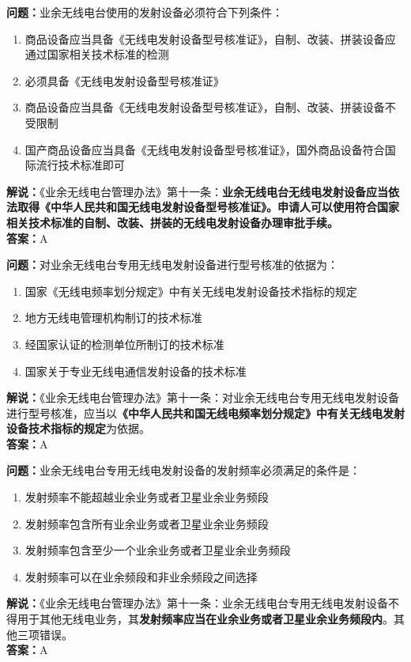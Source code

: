 \textbf{问题：}业余无线电台使用的发射设备必须符合下列条件：
\begin{enumerate}[label=\Alph*), leftmargin=1cm]
	\item 商品设备应当具备《无线电发射设备型号核准证》，自制、改装、拼装设备应通过国家相关技术标准的检测
	\item 必须具备《无线电发射设备型号核准证》
	\item 商品设备应当具备《无线电发射设备型号核准证》，自制、改装、拼装设备不受限制
	\item 国产商品设备应当具备《无线电发射设备型号核准证》，国外商品设备符合国际流行技术标准即可
\end{enumerate}
\textbf{解说：}《业余无线电台管理办法》第十一条：\textbf{业余无线电台无线电发射设备应当依法取得《中华人民共和国无线电发射设备型号核准证》。申请人可以使用符合国家相关技术标准的自制、改装、拼装的无线电发射设备办理审批手续。}\\\textbf{答案：}A


\textbf{问题：}对业余无线电台专用无线电发射设备进行型号核准的依据为：
\begin{enumerate}[label=\Alph*), leftmargin=1cm]
	\item 国家《无线电频率划分规定》中有关无线电发射设备技术指标的规定
	\item 地方无线电管理机构制订的技术标准
	\item 经国家认证的检测单位所制订的技术标准
	\item 国家关于专业无线电通信发射设备的技术标准
\end{enumerate}
\textbf{解说：}《业余无线电台管理办法》第十一条：对业余无线电台专用无线电发射设备进行型号核准，应当以\textbf{《中华人民共和国无线电频率划分规定》中有关无线电发射设备技术指标的规定}为依据。\\\textbf{答案：}A

\textbf{问题：}业余无线电台专用无线电发射设备的发射频率必须满足的条件是：
\begin{enumerate}[label=\Alph*), leftmargin=1cm]
	\item 发射频率不能超越业余业务或者卫星业余业务频段
	\item 发射频率包含所有业余业务或者卫星业余业务频段
	\item 发射频率包含至少一个业余业务或者卫星业余业务频段
	\item 发射频率可以在业余频段和非业余频段之间选择
\end{enumerate}
\textbf{解说：}《业余无线电台管理办法》第十一条：业余无线电台专用无线电发射设备不得用于其他无线电业务，其\textbf{发射频率应当在业余业务或者卫星业余业务频段内}。其他三项错误。\\\textbf{答案：}A

